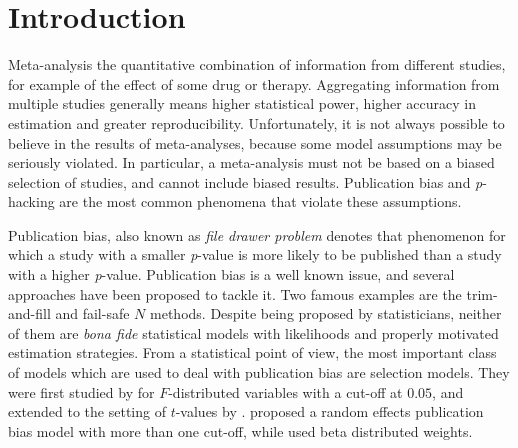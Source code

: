 \documentclass{article}
\theoremstyle{plain}
\theoremstyle{definition}
\begin{document}



\section{Introduction}

Meta-analysis the quantitative combination of information from different studies, for example of the effect of some drug or therapy. Aggregating information from multiple studies generally means higher statistical power, higher accuracy in estimation and greater reproducibility. Unfortunately, it is not always possible to believe in the results of meta-analyses, because some model assumptions may be seriously violated. In particular, a meta-analysis must not be based on a biased selection of studies, and cannot include biased results. Publication bias \citep{sterling1959publication} and \textit{p}-hacking \citep{simmons2011false} are the most common phenomena that violate these assumptions. 

Publication bias, also known as \emph{file drawer problem} \citep[see, e.g.,][]{iyengar1988selection} denotes that phenomenon for which a study with a smaller \emph{p}-value is more likely to be published than a study with a higher \emph{p}-value. Publication bias is a well known issue, and several approaches have been proposed to tackle it. Two famous examples are the trim-and-fill \citep{duval2000trim} and fail-safe $N$ \citep{becker2005failsafe} methods. Despite being proposed by statisticians, neither of them are \emph{bona fide} statistical models with likelihoods and properly motivated estimation strategies. From a statistical point of view, the most important class of models which are used to deal with publication bias are selection models. They were first studied by \citet{hedges1984estimation} for $F$-distributed variables with a cut-off at $0.05$, and extended to the setting of $t$-values by \citet{iyengar1988selection}. \citet{hedges1992modeling} proposed a random effects publication bias model with more than one cut-off, while \citet{citkowicz2017parsimonious} used beta distributed weights.
\end{document}
